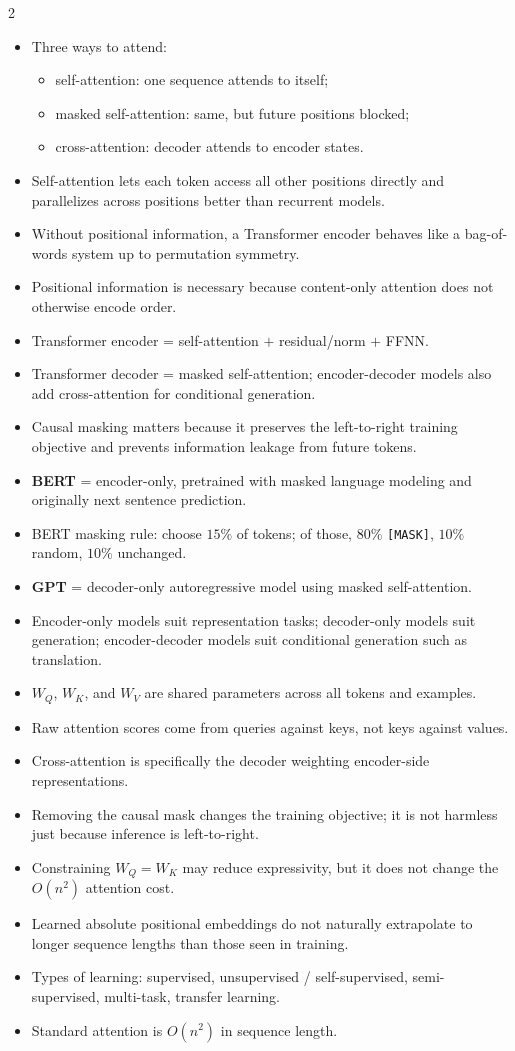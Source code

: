 \documentclass[10pt]{article}
\begin{document}
\begin{multicols*}{2}
\begin{itemize}
\item Three ways to attend:
\begin{itemize}
\item self-attention: one sequence attends to itself;
\item masked self-attention: same, but future positions blocked;
\item cross-attention: decoder attends to encoder states.
\end{itemize}
\item Self-attention lets each token access all other positions directly and parallelizes across positions better than recurrent models.
\item Without positional information, a Transformer encoder behaves like a bag-of-words system up to permutation symmetry.
\item Positional information is necessary because content-only attention does not otherwise encode order.
\item Transformer encoder = self-attention \(+\) residual/norm \(+\) FFNN.
\item Transformer decoder = masked self-attention; encoder-decoder models also add cross-attention for conditional generation.
\item Causal masking matters because it preserves the left-to-right training objective and prevents information leakage from future tokens.
\item \textbf{BERT} = encoder-only, pretrained with masked language modeling and originally next sentence prediction.
\item BERT masking rule: choose \(15\%\) of tokens; of those, \(80\%\) \texttt{[MASK]}, \(10\%\) random, \(10\%\) unchanged.
\item \textbf{GPT} = decoder-only autoregressive model using masked self-attention.
\item Encoder-only models suit representation tasks; decoder-only models suit generation; encoder-decoder models suit conditional generation such as translation.
\item \(W_Q\), \(W_K\), and \(W_V\) are shared parameters across all tokens and examples.
\item Raw attention scores come from queries against keys, not keys against values.
\item Cross-attention is specifically the decoder weighting encoder-side representations.
\item Removing the causal mask changes the training objective; it is not harmless just because inference is left-to-right.
\item Constraining \(W_Q=W_K\) may reduce expressivity, but it does not change the \(O(n^2)\) attention cost.
\item Learned absolute positional embeddings do not naturally extrapolate to longer sequence lengths than those seen in training.
\item Types of learning: supervised, unsupervised / self-supervised, semi-supervised, multi-task, transfer learning.
\item Standard attention is \(O(n^2)\) in sequence length.
\end{itemize}


\end{multicols*}
\end{document}
